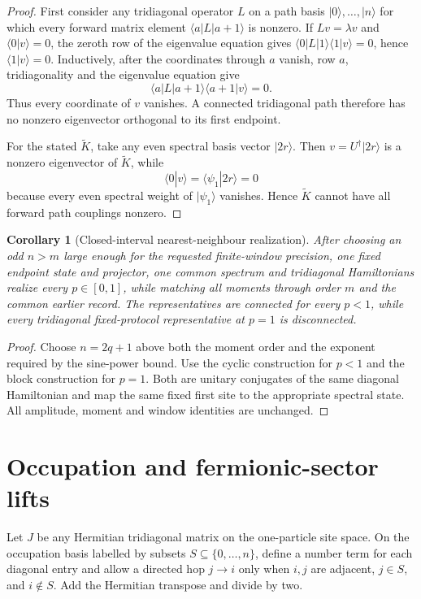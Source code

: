 \documentclass[12pt]{article}
\newtheorem{corollary}[theorem]{Corollary}
\begin{document}
\begin{proof}
First consider any tridiagonal operator \(L\) on a path basis
\(|0\rangle,\ldots,|n\rangle\) for which every forward matrix element
\(\langle a|L|a+1\rangle\) is nonzero. If \(Lv=\lambda v\) and
\(\langle0|v\rangle=0\), the zeroth row of the eigenvalue equation gives
\(\langle0|L|1\rangle\langle1|v\rangle=0\), hence
\(\langle1|v\rangle=0\). Inductively, after the coordinates through \(a\)
vanish, row \(a\), tridiagonality and the eigenvalue equation give
\[
 \langle a|L|a+1\rangle\langle a+1|v\rangle=0.
\]
Thus every coordinate of \(v\) vanishes. A connected tridiagonal path
therefore has no nonzero eigenvector orthogonal to its first endpoint.

For the stated \(\widetilde K\), take any even spectral basis vector
\(|2r\rangle\). Then \(v=U^\dagger|2r\rangle\) is a nonzero eigenvector of
\(\widetilde K\), while
\[
 \langle0|v\rangle
 =\langle\psi_1|2r\rangle=0
\]
because every even spectral weight of \(|\psi_1\rangle\) vanishes. Hence
\(\widetilde K\) cannot have all forward path couplings nonzero.
\end{proof}

\begin{corollary}[Closed-interval nearest-neighbour realization]
After choosing an odd \(n>m\) large enough for the requested finite-window
precision, one fixed endpoint state and projector, one common spectrum and
tridiagonal Hamiltonians realize every \(p\in[0,1]\), while matching all
moments through order \(m\) and the common earlier record.
The representatives are connected for every \(p<1\), while every
tridiagonal fixed-protocol representative at \(p=1\) is disconnected.
\end{corollary}

\begin{proof}
Choose \(n=2q+1\) above both the moment order and the exponent required by
the sine-power bound. Use the cyclic construction for \(p<1\) and the
block construction for \(p=1\). Both are unitary conjugates of the same
diagonal Hamiltonian and map the same fixed first site to the appropriate
spectral state. All amplitude, moment and window identities are unchanged.
\end{proof}

\section{Occupation and fermionic-sector lifts}

Let \(J\) be any Hermitian tridiagonal matrix on the one-particle site
space. On the occupation basis labelled by subsets \(S\subseteq
\{0,\ldots,n\}\), define a number term for each diagonal entry and allow a
directed hop \(j\to i\) only when \(i,j\) are adjacent, \(j\in S\), and
\(i\notin S\). Add the Hermitian transpose and divide by two.
\end{document}
